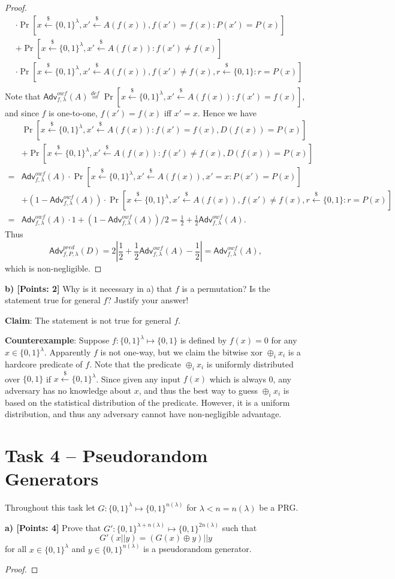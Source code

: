 \documentclass[12pt]{article}
\newcommand{\eqdef}{\stackrel{def}{=}}
\newcommand{\bits}{\{0,1\}}
\newcommand{\getsr}{\stackrel{\$}{\gets}}
\newcommand{\Adv}{\textsf{Adv}}
\theoremstyle{definition}
\begin{document}
\begin{proof}
$$\begin{aligned}
&\cdot\Pr[x\getsr\bits^\lambda, x'\getsr A(f(x)), f(x')=f(x): P(x') = P(x)] \\
&+\Pr[x\getsr\bits^\lambda, x'\getsr A(f(x)) : f(x')\not=f(x)]\\
&\cdot\Pr[x\getsr\bits^\lambda, x'\getsr A(f(x)), f(x')\not=f(x), r\getsr\bits: r = P(x)] \\
\end{aligned}
$$
Note that $\Adv_{f,\lambda}^{owf}(A) \eqdef \Pr[x\getsr\bits^\lambda, x'\getsr A(f(x)) : f(x')=f(x)]$, and since $f$ is one-to-one, $f(x')=f(x)$ iff $x'=x$. Hence we have
$$
\begin{aligned}
&\Pr[x\getsr\bits^\lambda, x'\getsr A(f(x)) : f(x')=f(x), D(f(x)) = P(x)] \\
&+\Pr[x\getsr\bits^\lambda, x'\getsr A(f(x)) : f(x')\not=f(x), D(f(x)) = P(x)] \\
=&\Adv_{f,\lambda}^{owf}(A)\cdot\Pr[x\getsr\bits^\lambda, x'\getsr A(f(x)), x'=x: P(x') = P(x)] \\
&+(1-\Adv_{f,\lambda}^{owf}(A))\cdot\Pr[x\getsr\bits^\lambda, x'\getsr A(f(x)), f(x')\not=f(x), r\getsr\bits: r = P(x)] \\
=&\Adv_{f,\lambda}^{owf}(A)\cdot 1 + (1-\Adv_{f,\lambda}^{owf}(A))/2 = \frac{1}{2} + \frac{1}{2}\Adv_{f,\lambda}^{owf}(A).
\end{aligned}
$$
Thus
$$\Adv_{f,P,\lambda}^{pred}(D) = 2\left| \frac{1}{2} + \frac{1}{2}\Adv_{f,\lambda}^{owf}(A)-\frac{1}{2} \right| = \Adv_{f,\lambda}^{owf}(A),$$
which is non-negligible.
\end{proof}

{\bf b) [Points: 2]} Why is it necessary in a) that $f$ is a permutation? Is the statement true for
general $f$? Justify your answer!

{\bf Claim}: The statement is not true for general $f$.

{\bf Counterexample}: Suppose $f : \bits^\lambda \mapsto \bits$ is defined by $f(x) = 0$ for any $x\in\bits^\lambda$. Apparently $f$ is not one-way, but we claim the bitwise xor $\oplus_i x_i$ is a hardcore predicate of $f$. Note that the predicate $\oplus_i x_i$ is uniformly distributed over $\bits$ if $x\getsr\bits^\lambda$. Since given any input $f(x)$ which is always 0, any adversary has no knowledge about $x$, and thus the best way to guess $\oplus_i x_i$ is based on the statistical distribution of the predicate. However, it is a uniform distribution, and thus any adversary cannot have non-negligible advantage.


\section{Task 4 – Pseudorandom Generators}
Throughout this task let $G : \bits^\lambda \mapsto \bits^{n(\lambda)}$ for $\lambda<n=n(\lambda)$ be a PRG.

{\bf a) [Points: 4]} Prove that $G' : \bits^{\lambda + n(\lambda)} \mapsto \bits^{2n(\lambda)}$ such that
$$G'(x||y) = (G(x)\oplus y)||y$$
for all $x\in\bits^\lambda$ and $y\in \bits^{n(\lambda)}$ is a pseudorandom generator.
\begin{proof}

\end{proof}
\end{document}

